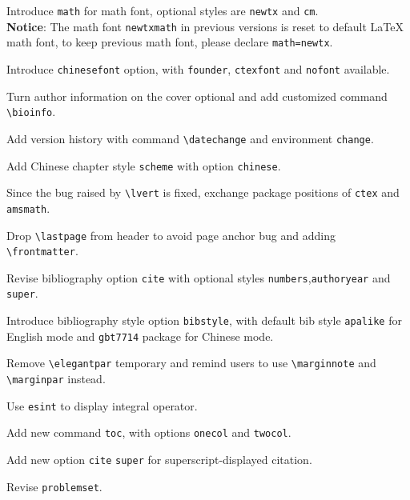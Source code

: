 \documentclass[11pt,bibtex]{elegantbook}
\begin{document}
\begin{change}
  \item Introduce \lstinline{math} for math font, optional styles are \lstinline{newtx} and \lstinline{cm}.\\
  \textbf{Notice}: The math font \lstinline{newtxmath} in previous versions is reset to default \LaTeX{} math font, to keep previous math font, please declare \lstinline{math=newtx}.
  \item Introduce \lstinline{chinesefont} option, with \lstinline{founder}, \lstinline{ctexfont} and \lstinline{nofont} available.
  \item Turn author information on the cover optional and add customized command \lstinline{\bioinfo}.
  \item Add version history with command \lstinline{\datechange} and environment \lstinline{change}.
  \item Add Chinese chapter style \lstinline{scheme} with option \lstinline{chinese}.
  \item Since the bug raised by \lstinline{\lvert} is fixed, exchange package positions of \lstinline{ctex} and \lstinline{amsmath}.
  \item Drop \lstinline{\lastpage} from header to avoid page anchor bug and adding \lstinline{\frontmatter}.
  \item Revise bibliography option \lstinline{cite} with optional styles \lstinline{numbers},\lstinline{authoryear} and \lstinline{super}.
  \item Introduce bibliography style option \lstinline{bibstyle}, with default bib style \lstinline{apalike} for English mode and \lstinline{gbt7714} package for Chinese mode.
\end{change}


\begin{change}
  \item Remove \lstinline{\elegantpar} temporary and remind users to use \lstinline{\marginnote} and \lstinline{\marginpar} instead.
  \item Use \lstinline{esint} to display integral operator.
  \item Add new command \lstinline{toc}, with options  \lstinline{onecol} and \lstinline{twocol}.
  \item Add new option \lstinline{cite} \lstinline{super} for superscript-displayed citation.
  \item Revise \lstinline{problemset}.
\end{change}
\end{document}
